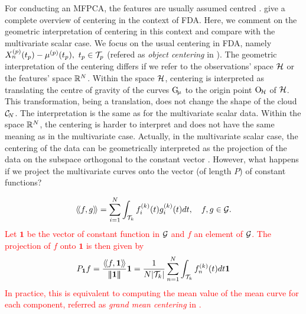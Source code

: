 For conducting an MFPCA, the features are usually assumed centred \citep{happMultivariateFunctionalPrincipal2018a}. \cite{protheroNewPerspectivesCentering2021} give a complete overview of centering in the context of FDA. Here, we comment on the geometric interpretation of centering in this context and compare with the multivariate scalar case. We focus on the usual centering in FDA, namely $X_n^{(p)}(t_p) - \mu^{(p)}(t_p),~t_p \in \mathcal{T}_{p}$ (refered as \emph{object centering} in \cite{protheroNewPerspectivesCentering2021}).
The geometric interpretation of the centering differs if we refer to the observations' space $\mathcal{H}$ or the features' space $\mathbb{R}^N$. Within the space $\mathcal{H}$, centering is interpreted as translating the centre of gravity of the curves $\mathrm{G}_{\!\mu}$ to the origin point $\mathrm{O}_{\!\mathcal{H}}$ of $\mathcal{H}$. This transformation, being a translation, does not change the shape of the cloud $\mathcal{C}_{\!N}$. The interpretation is the same as for the multivariate scalar data. Within the space $\mathbb{R}^N$, the centering is harder to interpret and does not have the same meaning as in the multivariate case. Actually, in the multivariate scalar case, the centering of the data can be geometrically interpreted as the projection of the data on the subspace orthogonal to the constant vector \citep{pagesMultipleFactorAnalysis2014}. However, what happens if we project the multivariate curves onto the vector (of length $P$) of constant functions?

\textcolor{red}{
\begin{equation}
\langle\!\langle f, g\rangle\!\rangle = \sum_{i = 1}^N \int_{\mathcal{T}_{k}} f^{(k)}_i(t)g^{(k)}_i(t)dt, \quad f, g \in \mathcal{G}.
\end{equation}
Let $\mathbf{1}$ be the vector of constant function in $\mathcal{G}$ and $f$ an element of $\mathcal{G}$. The projection of $f$ onto $\mathbf{1}$ is then given by
\begin{equation}
P_{\mathbf{1}}f = \frac{\langle\!\langle f, \mathbf{1}\rangle\!\rangle}{\left|\!\left|\!\left|\mathbf{1}\right|\!\right|\!\right|}\mathbf{1} = \frac{1}{N\lvert \mathcal{T}_{k} \rvert}\sum_{n = 1}^N \int_{\mathcal{T}_{k}} f^{(k)}_n(t)dt\mathbf{1}
\end{equation}
In practice, this is equivalent to computing the mean value of the mean curve for each component, referred as \emph{grand mean centering} in \cite{protheroNewPerspectivesCentering2021}.}

